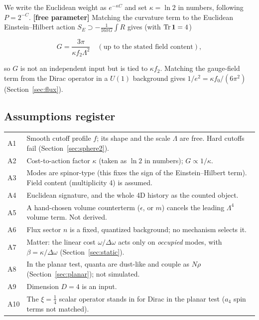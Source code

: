 \documentclass[11pt]{article}
\newcommand{\flag}[1]{\textbf{[#1]}}
\begin{document}
We write the Euclidean weight as $e^{-\kappa C}$ and set $\kappa=\ln 2$ in numbers, following
$P=2^{-C}$. \flag{free parameter} Matching the curvature term to the Euclidean
Einstein--Hilbert action $S_E\supset-\tfrac1{16\pi G}\!\int\! R$ gives (with $\Tr\mathbf 1=4$)

\begin{equation}
G=\frac{3\pi}{\kappa f_2\Lambda^{2}}\quad(\text{up to the stated field content}),
\label{eq:G}
\end{equation}

so $G$ is not an independent input but is tied to $\kappa f_2$.
Matching the gauge-field term from the Dirac operator in a $U(1)$ background gives
$1/e^2=\kappa f_0/(6\pi^2)$ (Section~\ref{sec:flux}).

\subsection{Assumptions register}\label{sec:assumptions}
\begin{center}
\small
\begin{tabular}{@{}l p{11.5cm}@{}}
\toprule
A1 & Smooth cutoff profile $f$; its shape and the scale $\Lambda$ are free. Hard cutoffs fail (Section~\ref{sec:sphere2}).\\
A2 & Cost-to-action factor $\kappa$ (taken as $\ln 2$ in numbers); $G\propto1/\kappa$.\\
A3 & Modes are spinor-type (this fixes the sign of the Einstein--Hilbert term). Field content (multiplicity 4) is assumed.\\
A4 & Euclidean signature, and the whole 4D history as the counted object.\\
A5 & A hand-chosen volume counterterm ($\epsilon$, or $m$) cancels the leading $\Lambda^4$ volume term. Not derived.\\
A6 & Flux sector $n$ is a fixed, quantized background; no mechanism selects it.\\
A7 & Matter: the linear cost $\omega/\Delta\omega$ acts only on \emph{occupied} modes, with $\beta=\kappa/\Delta\omega$ (Section~\ref{sec:static}).\\
A8 & In the planar test, quanta are dust-like and couple as $N\rho$ (Section~\ref{sec:planar}); not simulated.\\
A9 & Dimension $D=4$ is an input.\\
A10 & The $\xi=\tfrac14$ scalar operator stands in for Dirac in the planar test ($a_4$ spin terms not matched).\\
\bottomrule
\end{tabular}
\end{center}
\end{document}
